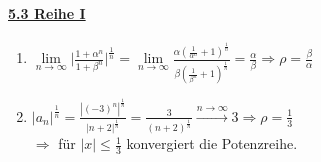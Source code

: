 \documentclass[8pt]{extreport}
\begin{document}
\paragraph{\underline{5.3 Reihe I}}
\begin{enumerate}[label =(\alph*)]
\item $\lim\limits_{n \to \infty} \bigg| \frac{1 + \alpha^n}{1 + \beta^n} \bigg|^\frac{1}{n} = \lim\limits_{n \to \infty} \frac{\alpha(\frac{1}{\alpha^n} + 1)^\frac{1}{n}}{\beta(\frac{1}{\beta^n}+1)^\frac{1}{n}} = \frac{\alpha}{\beta} \Rightarrow \rho = \frac{\beta}{\alpha}$
\item $|a_n|^\frac{1}{n} = \frac{|(-3)^n|^\frac{1}{n}}{|n+2|^\frac{1}{n}} = \frac{3}{(n+2)^\frac{1}{n}} \xrightarrow{n \to \infty}  3 \Rightarrow \rho = \frac{1}{3}$\\
$\Rightarrow$ für $|x| \leq \frac{1}{3}$ konvergiert die Potenzreihe.
\end{enumerate}
\end{document}
